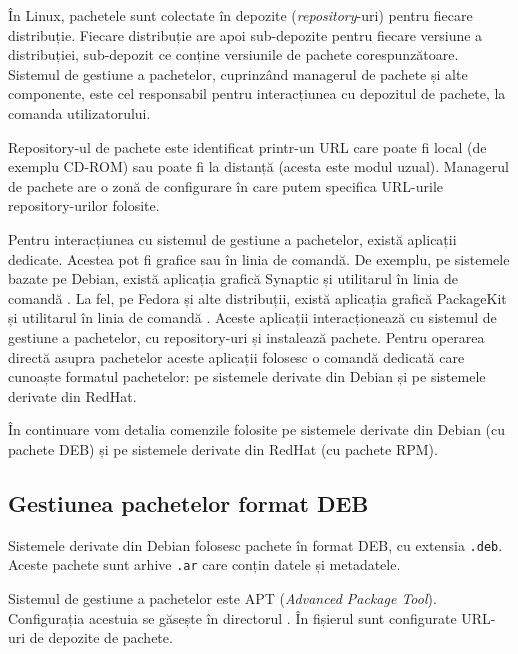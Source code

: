 În Linux, pachetele sunt colectate în depozite (\textit{repository}-uri) pentru fiecare distribuție.
Fiecare distribuție are apoi sub-depozite pentru fiecare versiune a distribuției, sub-depozit ce conține versiunile de pachete corespunzătoare.
Sistemul de gestiune a pachetelor, cuprinzând managerul de pachete și alte componente, este cel responsabil pentru interacțiunea cu depozitul de pachete, la comanda utilizatorului.

Repository-ul de pachete este identificat printr-un URL care poate fi local (de exemplu CD-ROM) sau poate fi la distanță (acesta este modul uzual).
Managerul de pachete are o zonă de configurare în care putem specifica URL-urile repository-urilor folosite.

Pentru interacțiunea cu sistemul de gestiune a pachetelor, există aplicații dedicate.
Acestea pot fi grafice sau în linia de comandă.
De exemplu, pe sistemele bazate pe Debian, există aplicația grafică Synaptic și utilitarul în linia de comandă .
La fel, pe Fedora și alte distribuții, există aplicația grafică PackageKit și utilitarul în linia de comandă .
Aceste aplicații interacționează cu sistemul de gestiune a pachetelor, cu repository-uri și instalează pachete.
Pentru operarea directă asupra pachetelor aceste aplicații folosesc o comandă dedicată care cunoaște formatul pachetelor:  pe sistemele derivate din Debian și  pe sistemele derivate din RedHat.

În continuare vom detalia comenzile folosite pe sistemele derivate din Debian (cu pachete DEB) și pe sistemele derivate din RedHat (cu pachete RPM).

\subsection{Gestiunea pachetelor format DEB}
\label{sec:package:deb}

Sistemele derivate din Debian folosesc pachete în format DEB, cu extensia \texttt{.deb}.
Aceste pachete sunt arhive \texttt{.ar} care conțin datele și metadatele.

Sistemul de gestiune a pachetelor este APT  (\textit{Advanced Package Tool}).
Configurația acestuia se găsește în directorul .
În fișierul  sunt configurate URL-uri de depozite de pachete.


